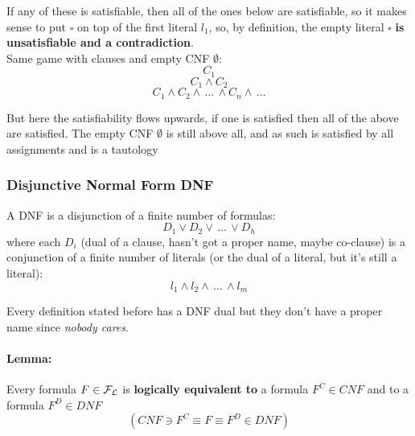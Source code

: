 \documentclass[11pt]{article}
\begin{document}
	If any of these is satisfiable, then all of the ones below are satisfiable, so it makes sense to put $\square$ on top of the first literal $l_1$, so, by definition, the empty literal $\square$ \textbf{is unsatisfiable and a contradiction}.\\
	
	Same game with clauses and empty CNF $\emptyset$:
	$$ C_1 $$
	$$ C_1 \wedge C_2 $$
	$$ C_1 \wedge C_2 \wedge \, \dots \, \wedge C_n \wedge \, \dots $$
	
	But here the satisfiability flows upwards, if one is satisfied then all of the above are satisfied. The empty CNF $\emptyset$ is still above all, and as such is satisfied by all assignments and is a tautology
	
	\subsubsection{Disjunctive Normal Form DNF}
	
	A DNF is a disjunction of a finite number of formulas: 
	$$ D_1 \vee D_2 \vee \, \dots \, \vee D_h $$
	where each $D_i$ (dual of a clause, hasn't got a proper name, maybe co-clause) is a conjunction of a finite number of literals (or the dual of a literal, but it's still a literal):
	$$ l_1 \wedge l_2 \wedge \, \dots \, \wedge l_m $$
	
	Every definition stated before has a DNF dual but they don't have a proper name since \textit{nobody cares}.\\
	
	\paragraph{Lemma:} Every formula $F \in \mathcal{F}_\mathcal{L}$ is \textbf{logically equivalent to} a formula $F^C \in CNF$ and to a formula $F^D \in DNF$
	$$ (CNF \ni F^C \equiv F \equiv F^D \in DNF )$$
	
\end{document}
